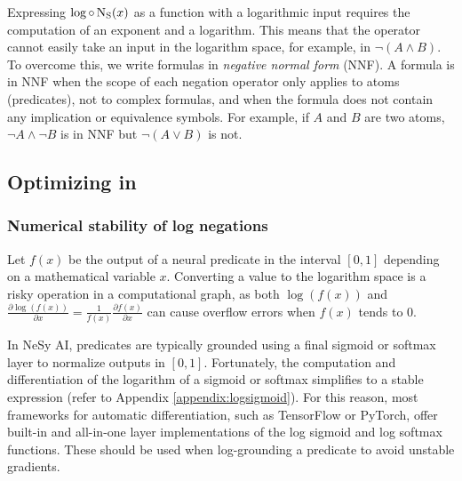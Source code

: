 \documentclass{article}
\theoremstyle{definition}
\begin{document}
Expressing $\log\circ\operatorname{N_{S}}(x)$ as a function with a logarithmic input %
requires the computation of an exponent and a logarithm.
This means that the operator cannot easily take an input in the logarithm space, 
for example, in $\lnot(A \land B)$.
To overcome this, we write formulas in \emph{negative normal form} (NNF).
A formula is in NNF 
when the scope of each negation operator only applies to atoms (predicates), not to complex formulas, 
and when the formula does not contain any implication or equivalence symbols.
For example, if $A$ and $B$ are two atoms, $\lnot A \land \lnot B$ is in NNF but $\lnot(A \lor B)$ is not.


\subsection{Optimizing in \logLTN}
\label{s:logltn_opti}

\subsubsection{Numerical stability of log negations}
\label{s:lognotsigmoid}
Let $f(x)$ be the output of a neural predicate in the interval $[0,1]$ depending on a mathematical variable $x$.
Converting a value to the logarithm space is a risky operation in a computational graph, as both $\log(f(x))$ and $\frac{\partial \log(f(x))}{\partial x}= \frac{1}{f(x)} \frac{\partial f(x)}{\partial x}$ 
can cause overflow errors when $f(x)$ tends to $0$.

In NeSy AI, predicates are typically grounded using a final sigmoid or softmax layer to normalize outputs in $[0,1]$.
Fortunately, the computation and differentiation of the logarithm of a sigmoid or softmax simplifies to a stable expression (refer to Appendix \ref{appendix:logsigmoid}).
For this reason, most frameworks for automatic differentiation, such as TensorFlow or PyTorch, 
offer built-in and all-in-one layer implementations of the log sigmoid and log softmax functions.
These should be used when log-grounding a predicate to avoid unstable gradients.
\end{document}
